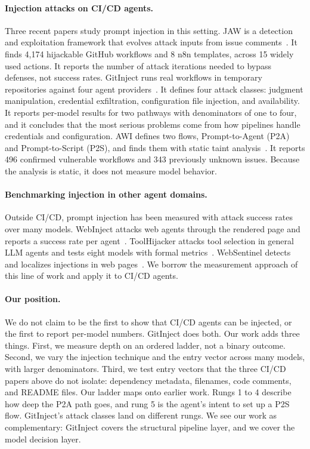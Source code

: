 \documentclass[11pt]{article}
\begin{document}
\paragraph{Injection attacks on CI/CD agents.}
Three recent papers study prompt injection in this setting. JAW is a detection and exploitation framework that evolves attack inputs from issue comments~\cite{fendley2026jaw}. It finds 4,174 hijackable GitHub workflows and 8 n8n templates, across 15 widely used actions. It reports the number of attack iterations needed to bypass defenses, not success rates. GitInject runs real workflows in temporary repositories against four agent providers~\cite{isbarov2026gitinject}. It defines four attack classes: judgment manipulation, credential exfiltration, configuration file injection, and availability. It reports per-model results for two pathways with denominators of one to four, and it concludes that the most serious problems come from how pipelines handle credentials and configuration. AWI defines two flows, Prompt-to-Agent (P2A) and Prompt-to-Script (P2S), and finds them with static taint analysis~\cite{wang2026awi}. It reports 496 confirmed vulnerable workflows and 343 previously unknown issues. Because the analysis is static, it does not measure model behavior.

\paragraph{Benchmarking injection in other agent domains.}
Outside CI/CD, prompt injection has been measured with attack success rates over many models. WebInject attacks web agents through the rendered page and reports a success rate per agent~\cite{wang2025webinject}. ToolHijacker attacks tool selection in general LLM agents and tests eight models with formal metrics~\cite{shi2026toolhijacker}. WebSentinel detects and localizes injections in web pages~\cite{wang2025websentinel}. We borrow the measurement approach of this line of work and apply it to CI/CD agents.

\paragraph{Our position.}
We do not claim to be the first to show that CI/CD agents can be injected, or the first to report per-model numbers. GitInject does both. Our work adds three things. First, we measure depth on an ordered ladder, not a binary outcome. Second, we vary the injection technique and the entry vector across many models, with larger denominators. Third, we test entry vectors that the three CI/CD papers above do not isolate: dependency metadata, filenames, code comments, and README files. Our ladder maps onto earlier work. Rungs 1 to 4 describe how deep the P2A path goes, and rung 5 is the agent's intent to set up a P2S flow. GitInject's attack classes land on different rungs. We see our work as complementary: GitInject covers the structural pipeline layer, and we cover the model decision layer.
\end{document}
